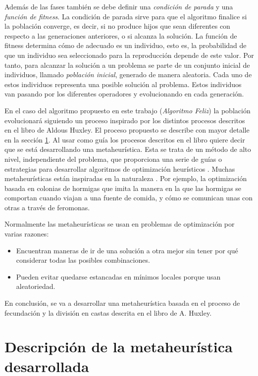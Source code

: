 Además de las fases también se debe definir una \emph{condición de parada} y una \emph{función de fitness}. La 
condición de parada sirve para que el algoritmo finalice si la población converge, es decir, si no produce hijos 
que sean diferentes con respecto a las generaciones anteriores, o si alcanza la solución. La función de fitness
determina cómo de adecuado es un individuo, esto es, la probabilidad de que un individuo sea seleccionado para 
la reproducción depende de este valor. Por tanto, para alcanzar la solución a un problema se parte de un conjunto 
inicial de individuos, llamado \textit{población inicial}, generado de manera aleatoria. Cada uno de estos 
individuos representa una posible solución al problema. Estos individuos van pasando por los diferentes operadores y 
evolucionando en cada generación.

En el caso del algoritmo propuesto en este trabajo (\emph{Algoritmo Feliz}) la población evolucionará siguiendo un proceso 
inspirado por los distintos procesos descritos en el libro de Aldous Huxley. El proceso propuesto se describe con mayor detalle
en la sección \ref{sect: description}. Al usar como guía los procesos descritos en el libro quiere decir que se está desarrollando 
una metaheurística. Esta se trata de un método de alto nivel, independiente del problema, que proporciona una serie de guías o 
estrategias para desarrollar algoritmos de optimización heurísticos \cite{metaheuristics_def}. Muchas metaheurísticas
están inspiradas en la naturaleza \cite{Molina2020ComprehensiveTO}. Por ejemplo, la optimización basada en colonias de
hormigas que imita la manera en la que las hormigas se comportan cuando viajan a una fuente de comida, y cómo se 
comunican unas con otras a través de feromonas. 

Normalmente las metaheurísticas se usan en problemas de optimización por varias razones:
\begin{itemize}
    \item Encuentran maneras de ir de una solución a otra mejor sin tener por qué considerar todas las posibles combinaciones. 
    \item Pueden evitar quedarse estancadas en mínimos locales porque usan aleatoriedad.
\end{itemize}

En conclusión, se va a desarrollar una metaheurística basada en el proceso de fecundación y la división en castas descrita en el 
libro de A. Huxley.

\section{Descripción de la metaheurística desarrollada} \label{sect: description}

